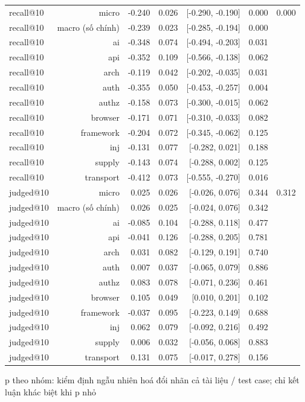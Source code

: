 \begin{table}[ht]
\begin{tabular}{lrrrrrr}
recall@10 & micro & -0.240 & 0.026 & [-0.290, -0.190] & 0.000 & 0.000 \\
recall@10 & macro (số chính) & -0.239 & 0.023 & [-0.285, -0.194] & 0.000 &  \\
recall@10 & ai & -0.348 & 0.074 & [-0.494, -0.203] & 0.031 &  \\
recall@10 & api & -0.352 & 0.109 & [-0.566, -0.138] & 0.062 &  \\
recall@10 & arch & -0.119 & 0.042 & [-0.202, -0.035] & 0.031 &  \\
recall@10 & auth & -0.355 & 0.050 & [-0.453, -0.257] & 0.004 &  \\
recall@10 & authz & -0.158 & 0.073 & [-0.300, -0.015] & 0.062 &  \\
recall@10 & browser & -0.171 & 0.071 & [-0.310, -0.033] & 0.082 &  \\
recall@10 & framework & -0.204 & 0.072 & [-0.345, -0.062] & 0.125 &  \\
recall@10 & inj & -0.131 & 0.077 & [-0.282, 0.021] & 0.188 &  \\
recall@10 & supply & -0.143 & 0.074 & [-0.288, 0.002] & 0.125 &  \\
recall@10 & transport & -0.412 & 0.073 & [-0.555, -0.270] & 0.016 &  \\
judged@10 & micro & 0.025 & 0.026 & [-0.026, 0.076] & 0.344 & 0.312 \\
judged@10 & macro (số chính) & 0.026 & 0.025 & [-0.024, 0.076] & 0.342 &  \\
judged@10 & ai & -0.085 & 0.104 & [-0.288, 0.118] & 0.477 &  \\
judged@10 & api & -0.041 & 0.126 & [-0.288, 0.205] & 0.781 &  \\
judged@10 & arch & 0.031 & 0.082 & [-0.129, 0.191] & 0.740 &  \\
judged@10 & auth & 0.007 & 0.037 & [-0.065, 0.079] & 0.886 &  \\
judged@10 & authz & 0.083 & 0.078 & [-0.071, 0.236] & 0.461 &  \\
judged@10 & browser & 0.105 & 0.049 & [0.010, 0.201] & 0.102 &  \\
judged@10 & framework & -0.037 & 0.095 & [-0.223, 0.149] & 0.688 &  \\
judged@10 & inj & 0.062 & 0.079 & [-0.092, 0.216] & 0.492 &  \\
judged@10 & supply & 0.006 & 0.032 & [-0.056, 0.068] & 0.883 &  \\
judged@10 & transport & 0.131 & 0.075 & [-0.017, 0.278] & 0.156 &  \\
\bottomrule
\end{tabular}
\par\smallskip\footnotesize p theo nhóm: kiểm định ngẫu nhiên hoá đổi nhãn cả tài liệu / test case; chỉ kết luận khác biệt khi p nhỏ
\end{table}


